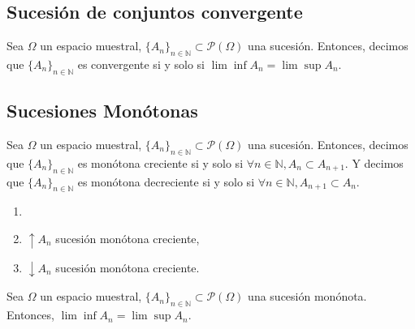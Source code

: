 \subsection{Sucesión de conjuntos convergente}

\begin{defn}[Covergencia]
  Sea $\Omega$ un espacio muestral, $\{ A_{n} \}_{n \in \mathbb{N}} \subset \mathcal{P}(\Omega)$ una sucesión. Entonces, decimos que $\{ A_{n} \}_{n \in \mathbb{N}}$ es convergente si y solo si $\lim \inf A_{n} = \lim \sup A_n$.
\end{defn}

\subsection{Sucesiones Monótonas}

\begin{defn}
  Sea $\Omega$ un espacio muestral, $\{ A_{n} \}_{n \in \mathbb{N}} \subset \mathcal{P}(\Omega)$ una sucesión. Entonces, decimos que $\{ A_{n} \}_{n \in \mathbb{N}}$ es monótona creciente si y solo si $\forall n \in \mathbb{N}, A_{n} \subset A_{n+1}$. Y decimos que $\{ A_{n} \}_{n \in \mathbb{N}}$ es monótona decreciente si y solo si $\forall n \in \mathbb{N}, A_{n+1} \subset A_{n}$.
\end{defn}

\begin{nota}
  \begin{enumerate}[label=(\roman*)]
    \item []
    \item $\uparrow A_{n}$ sucesión monótona creciente,
    \item $\downarrow A_{n}$ sucesión monótona creciente.
  \end{enumerate}
\end{nota}

\begin{prop}
Sea $\Omega$ un espacio muestral, $\{ A_{n} \}_{n \in \mathbb{N}} \subset \mathcal{P}(\Omega)$ una sucesión monónota. Entonces, $\lim \inf A_{n} = \lim \sup A_n$.
\end{prop}

